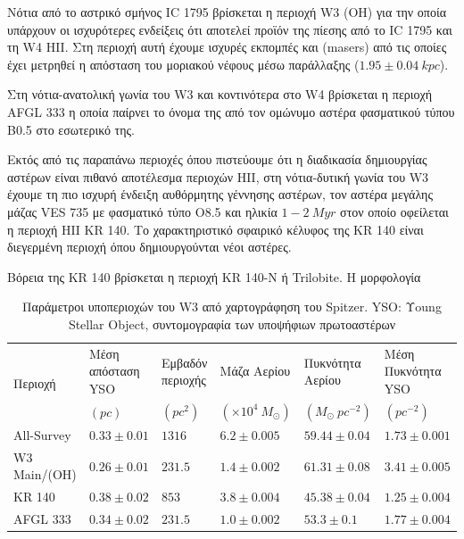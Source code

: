 \documentclass[a4paper,12pt]{memoir}
\newcommand{\e}[1]{\times 10^{#1}}
\begin{document}
Νότια από το αστρικό σμήνος IC 1795 βρίσκεται η περιοχή W3 (OH) για την οποία υπάρχουν οι ισχυρότερες ενδείξεις ότι αποτελεί προϊόν της πίεσης από το IC 1795 και τη  W4 HII. Στη περιοχή αυτή έχουμε ισχυρές εκπομπές  και  (masers) από τις οποίες έχει μετρηθεί η απόσταση του μοριακού νέφους μέσω παράλλαξης ($1.95 \pm 0.04 \ kpc$).

Στη νότια-ανατολική γωνία του W3 και κοντινότερα στο W4 βρίσκεται η περιοχή AFGL 333 η οποία παίρνει το όνομα της από τον ομώνυμο αστέρα φασματικού τύπου B0.5 στο εσωτερικό της. 

Εκτός από τις παραπάνω περιοχές όπου πιστεύουμε ότι η διαδικασία δημιουργίας αστέρων είναι πιθανό αποτέλεσμα περιοχών HII, στη νότια-δυτική γωνία του W3 έχουμε τη πιο ισχυρή ένδειξη αυθόρμητης γέννησης αστέρων, τον αστέρα μεγάλης μάζας VES 735 με φασματικό τύπο O8.5 και ηλικία $1-2 \ Myr$ στον οποίο οφείλεται η περιοχή HII KR 140. Το χαρακτηριστικό σφαιρικό κέλυφος της KR 140 είναι διεγερμένη περιοχή όπου δημιουργούνται νέοι αστέρες. 

Βόρεια της KR 140 βρίσκεται η περιοχή KR 140-N ή Trilobite. Η μορφολογία 


\begin{table}
	\caption{Παράμετροι υποπεριοχών του W3 από χαρτογράφηση του Spitzer. YSO: Υoung Stellar Object, συντομογραφία των υποψήφιων πρωτοαστέρων}
	\label{tab:ISM}
	\begin{tabular}{p{} p{2.5cm} p{1.5cm} p{2cm} p{2.2cm} p{2.5cm}}
		\toprule
		\multirow{2}{*}{Περιοχή} & Μέση απόσταση YSO & Εμβαδόν περιοχής & Μάζα Αερίου & Πυκνότητα Αερίου & Μέση Πυκνότητα YSO \\ 
		&  $(pc)$ & $(pc^2)$ & $(\e{4} \ M_{\odot})$ & $(M_{\odot} \ pc^{-2})$ & $ (pc^{-2}) $ \\
		\midrule
		All-Survey & $0.33 \pm 0.01$ & $1316$ & $6.2\pm0.005$ & $59.44\pm 0.04$ & $1.73\pm 0.001$ \\
	  W3 Main/(OH) & $0.26 \pm 0.01$ & $231.5$ & $1.4\pm0.002$ & $61.31\pm 0.08$ & $3.41\pm 0.005$ \\
	  KR 140 & $0.38 \pm 0.02$ & $853$ & $3.8\pm0.004$ & $45.38\pm 0.04$ & $1.25\pm 0.004$ \\
	  AFGL 333 & $0.34 \pm 0.02$ & $231.5$ & $1.0\pm0.002$ & $53.3\pm 0.1$ & $1.77\pm 0.004$ \\  
		\bottomrule		
	\end{tabular}
\end{table}
\end{document}
